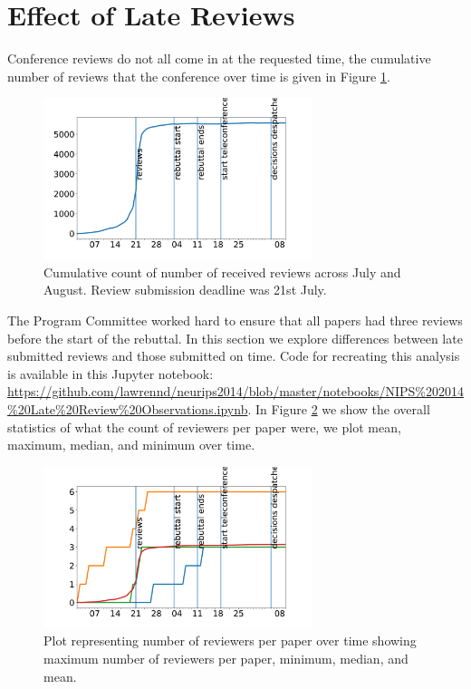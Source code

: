 \section{Effect of Late Reviews}
\label{app:effect-of-late-reviews}

Conference reviews do not all come in at the requested time, the cumulative number of reviews that the conference over time is given in Figure \ref{review-count}.

\begin{figure}[htb]
\centering
\includegraphics[width=0.70\textwidth]{diagrams/neurips/review-count.pdf}
\caption{Cumulative count of number of received reviews across July and August. Review submission deadline was 21st July.}
\label{review-count}
\end{figure}

The Program Committee worked hard to ensure that all  papers had three reviews
before the start of the rebuttal. In this section we explore differences between late submitted reviews and those submitted on time. Code for recreating this analysis is available in this Jupyter notebook: \url{https://github.com/lawrennd/neurips2014/blob/master/notebooks/NIPS%202014%20Late%20Review%20Observations.ipynb}.  In Figure \ref{number-of-reviews-over-time}  we show the  overall statistics of what the count of reviewers per
paper were, we plot mean, maximum, median, and minimum over time. 

\begin{figure}[htb]
\centering
\includegraphics[width=0.70\textwidth]{diagrams/neurips/number-of-reviews-over-time.pdf}

\caption{Plot representing number of reviewers per paper over time showing maximum number of reviewers per paper, minimum, median, and mean. }
\label{number-of-reviews-over-time}
\end{figure}


